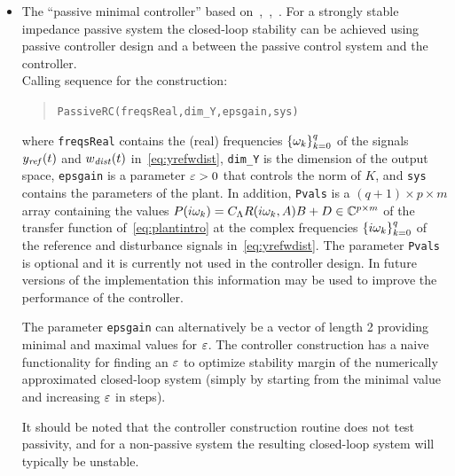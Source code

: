 \documentclass[11pt, a4paper]{amsart}
\newcommand{\COMMapproxRC}[1]{{\color{gray}#1}}
\renewcommand{\COMMapproxRC}[1]{}
\newcommand{\CL}{C_\Lambda}
\theoremstyle{definition}
\numberwithin{equation}{section}
\newcommand{\yref}{y_{\mbox{\scriptsize\textit{ref}}}}
\newcommand{\wdist}{w_{\mbox{\scriptsize\textit{dist}}}}
\begin{document}
\begin{itemize}
  \item The ``passive minimal controller'' based on~,~,~\cite{PauLeGLHMNC18}. For a strongly stable impedance passive system the closed-loop stability can be achieved using passive controller design and a  between the passive control system and the controller.\\[1ex]
      Calling sequence for the construction:\\[-1ex]
     \begin{quotation}
	 \texttt{PassiveRC(freqsReal,dim\_Y,epsgain,sys)}
     \end{quotation}
     \medskip
     where
     \texttt{freqsReal} contains the (real) frequencies $\{\omega_k\}_{k=0}^q$ of the signals $\yref(t)$ and $\wdist(t)$ in~\eqref{eq:yrefwdist}, \texttt{dim\_Y} is the dimension of the output space, \texttt{epsgain} is a parameter $\varepsilon>0$ that controls the norm of $K$,
     and \texttt{sys} contains the parameters of the plant.
     In addition, \texttt{Pvals} is a $(q+1)\times p\times m$ array containing the values $P(i\gw_k)=\CL R(i\gw_k,A)B+D\in \C^{p\times m}$ of the transfer function of~\eqref{eq:plantintro} at the complex frequencies $\{i\omega_k\}_{k=0}^q$ of the reference and disturbance signals in~\eqref{eq:yrefwdist}. The parameter \texttt{Pvals} is optional and it is currently not used in the controller design.
     In future versions of the implementation this information may be used to improve the performance of the controller.

The parameter \texttt{epsgain} can alternatively be a vector of length 2 providing minimal and maximal values for $\varepsilon$. The controller construction has a naive functionality for finding an $\varepsilon$ to optimize stability margin of the numerically approximated closed-loop system (simply by starting from the minimal value and increasing $\varepsilon$ in steps). 

It should be noted that the controller construction routine does not test passivity, and for a non-passive system the resulting closed-loop system will typically be unstable.


     \COMMapproxRC{
     \item An ``approximate robust controller'' based on the reference~\cite{HumKur18} for finite-dimensional approximate control design for systems with infinite-dimensional output spaces.\\[1ex]
	 Calling sequence for the construction:\\[-1ex]
	   \begin{quotation}
	     \texttt{ApproximateRC(\dots)}
	   \end{quotation}
	 }
\end{itemize}
\end{document}
